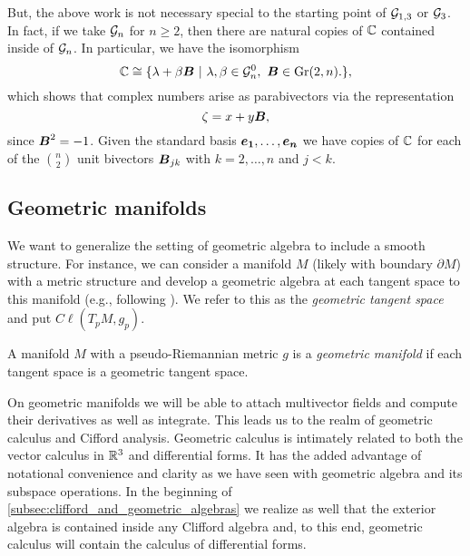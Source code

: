 But, the above work is not necessary special to the starting point of $\mathcal{G}_{1,3}$ or $\mathcal{G}_3$. In fact, if we take $\mathcal{G}_n$ for $n\geq 2$, then there are natural copies of $\mathbb{C}$ contained inside of $\mathcal{G}_n$. In particular, we have the isomorphism
\begin{equation}
    \mathbb{C} \cong \{\lambda + \beta \boldsymbol{B} ~\vert~ \lambda,\beta \in \mathcal{G}_n^0,~ \boldsymbol{B} \in \operatorname{Gr}(2,n). \},
\end{equation}
which shows that complex numbers arise as parabivectors via the representation
\begin{equation}
        \zeta = x + y\boldsymbol{B},
\end{equation}
since $\boldsymbol{B}^2=-1$. Given the standard basis $\boldsymbol{e_1},\dots,\boldsymbol{e_n}$ we have copies of $\mathbb{C}$ for each of the ${ n \choose 2}$ unit bivectors $\boldsymbol{B}_{jk}$ with $k=2,\dots,n$ and $j<k$.





\subsection{Geometric manifolds}

We want to generalize the setting of geometric algebra to include a smooth structure. For instance, we can consider a manifold $M$ (likely with boundary $\partial M$) with a metric structure and develop a geometric algebra at each tangent space to this manifold (e.g., following \cite{schindler_geometric_2020}). We refer to this as the \emph{geometric tangent space} and put $C\ell(T_pM,g_p)$.
\begin{definition}
A manifold $M$ with a pseudo-Riemannian metric $g$ is a \emph{geometric manifold} if each tangent space is a geometric tangent space.
\end{definition}
On geometric manifolds we will be able to attach multivector fields and compute their derivatives as well as integrate. This leads us to the realm of geometric calculus and Cifford analysis. Geometric calculus is intimately related to both the vector calculus in $\mathbb{R}^3$ and differential forms. It has the added advantage of notational convenience and clarity as we have seen with geometric algebra and its subspace operations. In the beginning of \cref{subsec:clifford_and_geometric_algebras} we realize as well that the exterior algebra is contained inside any Clifford algebra and, to this end, geometric calculus will contain the calculus of differential forms. 

